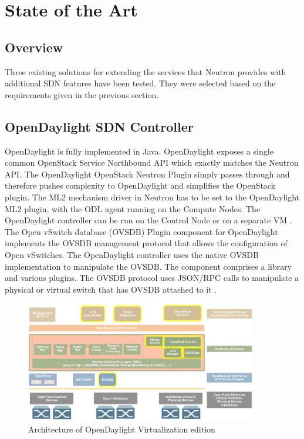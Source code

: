 \chapter{State of the Art}

\section{Overview}

Three existing solutions for extending the services that Neutron provides with additional SDN features have been tested. They were selected based on the requirements given in the previous section.

\section{OpenDaylight SDN Controller}


OpenDaylight is fully implemented in Java. OpenDaylight exposes a single common OpenStack Service Northbound API which exactly matches the Neutron API. The OpenDaylight OpenStack Neutron Plugin simply passes through and therefore pushes complexity to OpenDaylight and simplifies the OpenStack plugin. The ML2 mechanism driver in Neutron has to be set to the OpenDaylight ML2 plugin, with the ODL agent running on the Compute Nodes. The OpenDaylight controller can be run on the Control Node or on a separate VM \cite{odl-intro}. The Open vSwitch database (OVSDB) Plugin component for OpenDaylight implements the OVSDB management protocol that allows the configuration of Open vSwitches. The OpenDaylight controller uses the native OVSDB implementation to manipulate the OVSDB. The component comprises a library and various plugins. The OVSDB protocol uses JSON/RPC calls to manipulate a physical or virtual switch that has OVSDB attached to it \cite{odl-ovsdb}.

\begin{figure}[H]
\centering
\includegraphics[width=0.9\textwidth]{images/sota/odl_architecture.png}
\caption{Architecture of OpenDaylight Virtualization edition}
\end{figure}

